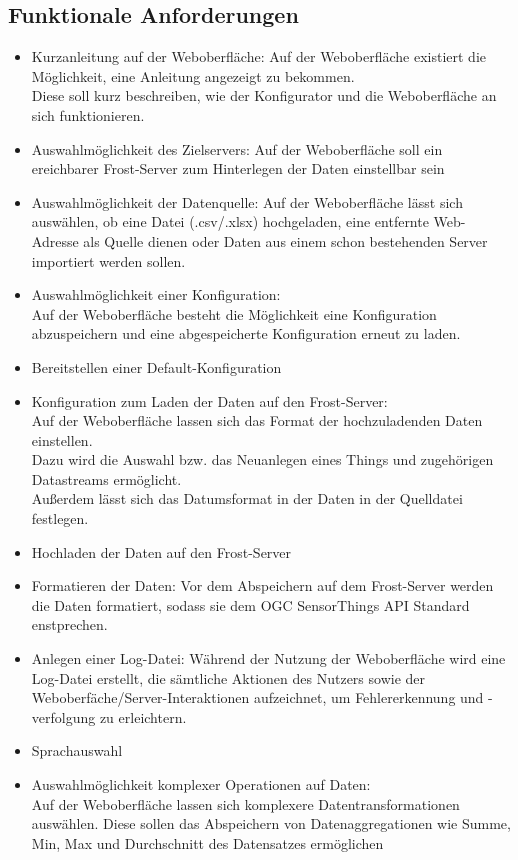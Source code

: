 \documentclass[12 pt]{article}
\begin{document}
	\subsection{Funktionale Anforderungen}
	
	\begin{itemize}
		\item Kurzanleitung auf der Weboberfläche: Auf der Weboberfläche existiert die Möglichkeit, eine Anleitung angezeigt zu bekommen. \\Diese soll kurz beschreiben, wie der Konfigurator und die Weboberfläche an sich funktionieren.
		\item Auswahlmöglichkeit des Zielservers: Auf der Weboberfläche soll ein ereichbarer Frost-Server zum Hinterlegen der Daten einstellbar sein
		\item Auswahlmöglichkeit der Datenquelle: Auf der Weboberfläche lässt sich auswählen, ob eine Datei (.csv/.xlsx) hochgeladen, eine entfernte Web-Adresse als Quelle dienen oder Daten aus einem schon bestehenden Server importiert werden sollen.
		\item Auswahlmöglichkeit einer Konfiguration: \\Auf der Weboberfläche besteht die Möglichkeit eine Konfiguration abzuspeichern und eine abgespeicherte Konfiguration erneut zu laden.
		\item Bereitstellen einer Default-Konfiguration
		\item Konfiguration zum Laden der Daten auf den Frost-Server: \\Auf der Weboberfläche lassen sich das Format der hochzuladenden Daten einstellen.\\ Dazu wird die Auswahl bzw. das Neuanlegen eines Things und zugehörigen Datastreams ermöglicht. \\Außerdem lässt sich das Datumsformat in der Daten in der Quelldatei festlegen.
		\item Hochladen der Daten auf den Frost-Server
		\item Formatieren der Daten: Vor dem Abspeichern auf dem Frost-Server werden die Daten formatiert, sodass sie dem OGC SensorThings API Standard enstprechen.
		\item Anlegen einer Log-Datei: Während der Nutzung der Weboberfläche wird eine Log-Datei erstellt, die sämtliche Aktionen des Nutzers sowie der Weboberfäche/Server-Interaktionen aufzeichnet, um Fehlererkennung und -verfolgung zu erleichtern.
		\item Sprachauswahl
		\item Auswahlmöglichkeit komplexer Operationen auf Daten: \\Auf der Weboberfläche lassen sich komplexere Datentransformationen auswählen. Diese sollen das Abspeichern von Datenaggregationen wie Summe, Min, Max und Durchschnitt des Datensatzes ermöglichen

\end{itemize}
\end{document}
